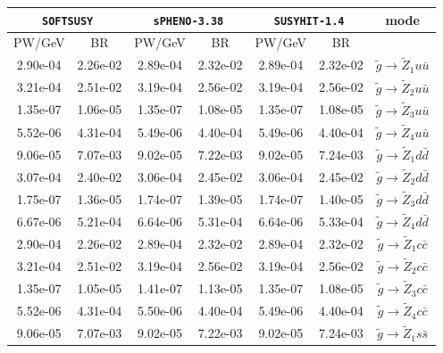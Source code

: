 \documentclass[final,3p,times,pdflatex]{elsarticle}
\begin{document}
\begin{center}
\begin{table}
\centering
\begin{tabular}{|c|c|c|c|c|c|c|} \hline
\multicolumn{2}{|C{3.0cm}|}{{\tt SOFTSUSY}} & \multicolumn{2}{C{3.0cm}|}{{\tt sPHENO-3.38}} & \multicolumn{2}{C{3.0cm}|}{{\tt SUSYHIT-1.4}} & mode \\ \hline
PW/GeV & BR & PW/GeV & BR & PW/GeV & BR & \\ \hline
2.90e-04 & 2.26e-02 & 2.89e-04 & 2.32e-02 & 2.89e-04 & 2.32e-02 & $\tilde{g} \rightarrow \tilde{Z}_1 u \bar{u}$ \\ \hline
3.21e-04 & 2.51e-02 & 3.19e-04 & 2.56e-02 & 3.19e-04 & 2.56e-02 & $\tilde{g} \rightarrow \tilde{Z}_2 u \bar{u}$ \\ \hline
1.35e-07 & 1.06e-05 & 1.35e-07 & 1.08e-05 & 1.35e-07 & 1.08e-05 & $\tilde{g} \rightarrow \tilde{Z}_3 u \bar{u}$ \\ \hline
5.52e-06 & 4.31e-04 & 5.49e-06 & 4.40e-04 & 5.49e-06 & 4.40e-04 & $\tilde{g} \rightarrow \tilde{Z}_4 u \bar{u}$ \\ \hline
9.06e-05 & 7.07e-03 & 9.02e-05 & 7.22e-03 & 9.02e-05 & 7.24e-03 & $\tilde{g} \rightarrow \tilde{Z}_1 d \bar{d}$ \\ \hline
3.07e-04 & 2.40e-02 & 3.06e-04 & 2.45e-02 & 3.06e-04 & 2.45e-02 &  $\tilde{g} \rightarrow \tilde{Z}_2 d \bar{d}$ \\ \hline
1.75e-07 & 1.36e-05 & 1.74e-07 & 1.39e-05 & 1.74e-07 & 1.40e-05 & $\tilde{g} \rightarrow \tilde{Z}_3 d \bar{d}$ \\ \hline
6.67e-06 & 5.21e-04 & 6.64e-06 & 5.31e-04 & 6.64e-06 & 5.33e-04 & $\tilde{g} \rightarrow \tilde{Z}_4 d \bar{d}$ \\ \hline
2.90e-04 & 2.26e-02 & 2.89e-04 & 2.32e-02 & 2.89e-04 & 2.32e-02 & $\tilde{g} \rightarrow \tilde{Z}_1 c \bar{c}$ \\ \hline
3.21e-04 & 2.51e-02 & 3.19e-04 & 2.56e-02 & 3.19e-04 & 2.56e-02 & $\tilde{g} \rightarrow \tilde{Z}_2 c \bar{c}$ \\ \hline
1.35e-07 & 1.05e-05 & 1.41e-07 & 1.13e-05 & 1.35e-07 & 1.08e-05 & $\tilde{g} \rightarrow \tilde{Z}_3 c \bar{c}$ \\ \hline
5.52e-06 & 4.31e-04 & 5.50e-06 & 4.40e-04 & 5.49e-06 & 4.40e-04  & $\tilde{g} \rightarrow \tilde{Z}_4 c \bar{c}$ \\ \hline
9.06e-05 & 7.07e-03 & 9.02e-05 & 7.22e-03 & 9.02e-05 & 7.24e-03  & $\tilde{g} \rightarrow \tilde{Z}_1 s \bar{s}$ \\ \hline

\end{tabular}
\end{table}
\end{center}
\end{document}

